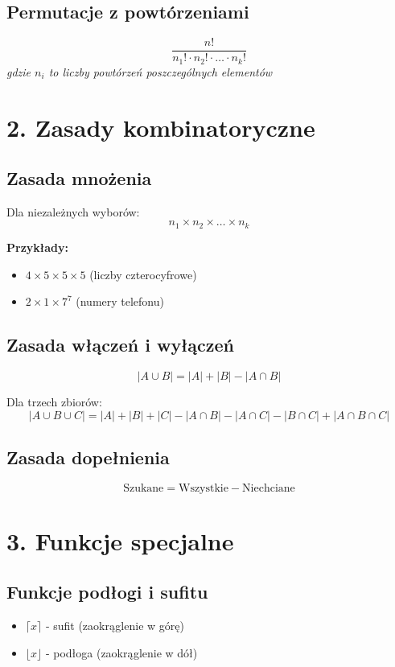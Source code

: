\documentclass[10pt,a4paper]{article}
\begin{document}
\begin{multicols}{2}
\subsection*{Permutacje z powtórzeniami}
$$\frac{n!}{n_1! \cdot n_2! \cdot \ldots \cdot n_k!}$$
\textit{gdzie $n_i$ to liczby powtórzeń poszczególnych elementów}

\section*{2. Zasady kombinatoryczne}

\subsection*{Zasada mnożenia}
Dla niezależnych wyborów:
$$n_1 \times n_2 \times \ldots \times n_k$$

\textbf{Przykłady:}
\begin{itemize}
\item $4 \times 5 \times 5 \times 5$ (liczby czterocyfrowe)
\item $2 \times 1 \times 7^7$ (numery telefonu)
\end{itemize}

\subsection*{Zasada włączeń i wyłączeń}
$$|A \cup B| = |A| + |B| - |A \cap B|$$

Dla trzech zbiorów:
$$|A \cup B \cup C| = |A| + |B| + |C| - |A \cap B| - |A \cap C| - |B \cap C| + |A \cap B \cap C|$$

\subsection*{Zasada dopełnienia}
$$\text{Szukane} = \text{Wszystkie} - \text{Niechciane}$$

\section*{3. Funkcje specjalne}

\subsection*{Funkcje podłogi i sufitu}
\begin{itemize}
\item $\lceil x \rceil$ - sufit (zaokrąglenie w górę)
\item $\lfloor x \rfloor$ - podłoga (zaokrąglenie w dół)
\end{itemize}


\end{multicols}
\end{document}
